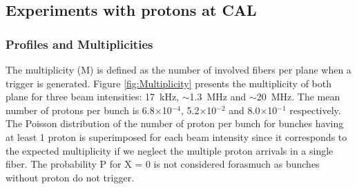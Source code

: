 \documentclass[a4paper,11pt]{article}
\begin{document}
\subsection{Experiments with protons at CAL}
\subsubsection{Profiles and Multiplicities}
\label{Profiles_And_Multiplies}
The multiplicity (M) is defined as the number of involved fibers per plane when a trigger is generated.
Figure \ref{fig:Multiplicity} presents the multiplicity of both plane for three beam intensities: 17~kHz, $\sim$1.3~MHz and $\sim$20~MHz. The mean number of protons per bunch is 6.8$\times$10$^{-4}$, 5.2$\times$10$^{-2}$ and 8.0$\times$10$^{-1}$ respectively. The Poisson distribution of the number of proton per bunch for bunches having at least 1 proton is superimposed for each beam intensity since it corresponds to the expected multiplicity if we neglect the multiple proton arrivals in a single fiber. The probability P for X = 0 is not considered forasmuch as bunches without proton do not trigger. 
\end{document}
